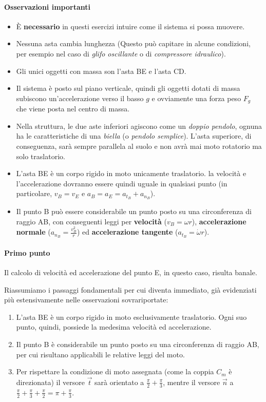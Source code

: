 \documentclass[main.tex]{subfiles}
\begin{document}
\paragraph{Osservazioni importanti}
\begin{itemize}
  \item È \textbf{necessario} in questi esercizi intuire come il sistema si possa muovere.
  \item Nessuna asta cambia lunghezza (Questo può capitare in alcune condizioni, per esempio nel caso di \textit{glifo oscillante} o di \textit{compressore idraulico}).
  \item Gli unici oggetti con massa son l'asta BE e l'asta CD.
    \item Il sistema è posto sul piano verticale, quindi gli oggetti dotati di massa subiscono un'accelerazione verso il basso $g$ e ovviamente una forza peso $F_g$ che viene posta nel centro di massa.
  \item Nella struttura, le due aste inferiori agiscono come un \textit{doppio pendolo}, ognuna ha le caratteristiche di una \textit{biella} (o \textit{pendolo semplice}). L'asta superiore, di conseguenza, sarà sempre parallela al suolo e non avrà mai moto rotatorio ma solo traslatorio.
  \item L'asta BE è un corpo rigido in moto unicamente traslatorio. la velocità e l'accelerazione dovranno essere quindi uguale in qualsiasi punto (in particolare, $v_B = v_E$ e $a_B = a_E = a_{t_B} + a_{n_B}$).
  \item Il punto B può essere considerabile un punto posto su una circonferenza di raggio AB, con conseguenti leggi per \textbf{velocità} ($v_B = \omega r$), \textbf{accelerazione normale} ($a_{n_B} = \frac{v_B^2}{r}$) ed \textbf{accelerazione tangente} ($a_{t_B} = \dot{\omega}r$).
\end{itemize}

\clearpage

\paragraph{Primo punto}
Il calcolo di velocità ed accelerazione del punto E, in questo caso, risulta banale.

Riassumiamo i passaggi fondamentali per cui diventa immediato, già evidenziati più estensivamente nelle osservazioni sovrariportate:

\begin{enumerate}
  \item L'asta BE è un corpo rigido in moto esclusivamente traslatorio. Ogni suo punto, quindi, possiede la medesima velocità ed accelerazione.
  \item Il punto B è considerabile un punto posto su una circonferenza di raggio AB, per cui risultano applicabili le relative leggi del moto.
  \item Per rispettare la condizione di moto assegnata (come la coppia $C_m$ è direzionata) il versore $\vec{t}$ sarà orientato a $\frac{\pi}{2}+\frac{\pi}{3}$, mentre il versore $\vec{n}$ a $\frac{\pi}{2}+\frac{\pi}{3} + \frac{\pi}{2} = \pi + \frac{\pi}{3}$.
\end{enumerate}
\end{document}
